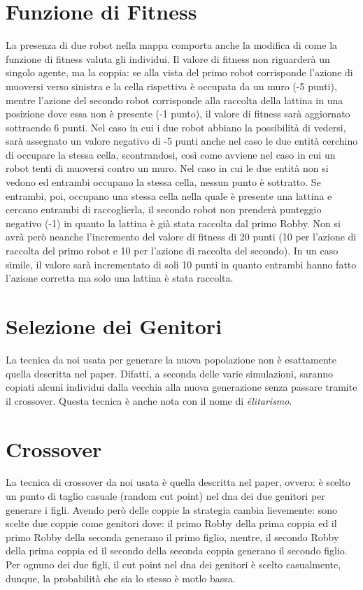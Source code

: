 \section{Funzione di Fitness}
La presenza di due robot nella mappa comporta anche la modifica di come la
funzione di fitness valuta gli individui. Il valore di fitness non riguarderà un
singolo agente, ma la coppia: se alla vista del primo robot corrisponde l'azione
di muoversi verso sinistra e la cella rispettiva è occupata da un muro (-5
punti), mentre l'azione del secondo robot corrisponde alla raccolta della
lattina in una posizione dove essa non è presente (-1 punto), il valore di
fitness sarà aggiornato sottraendo 6 punti.\newline
Nel caso in cui i due robot abbiano la possibilità di vedersi, sarà assegnato un
valore negativo di -5 punti anche nel caso le due entità cerchino di occupare la
stessa cella, scontrandosi, così come avviene nel caso in cui un robot tenti di
muoversi contro un muro.\newline
Nel caso in cui le due entità non si vedono ed entrambi occupano la stessa
cella, nessun punto è sottratto. Se entrambi, poi, occupano una stessa cella
nella quale è presente una lattina e cercano entrambi di raccoglierla, il
secondo robot non prenderà punteggio negativo (-1) in quanto la lattina è già
stata raccolta dal primo Robby. Non si avrà però neanche l'incremento del valore
di fitness di 20 punti (10 per l'azione di raccolta del primo robot e 10 per
l'azione di raccolta del secondo). In un caso simile, il valore sarà
incrementato di soli 10 punti in quanto entrambi hanno fatto l'azione corretta
ma solo una lattina è stata raccolta.

\section{Selezione dei Genitori}
La tecnica da noi usata per generare la nuova popolazione non è esattamente
quella descritta nel paper. Difatti, a seconda delle varie simulazioni, saranno
copiati alcuni individui dalla vecchia alla nuova generazione senza passare
tramite il crossover. Questa tecnica è anche nota con il nome di
\textit{élitarismo}.

\section{Crossover}
La tecnica di crossover da noi usata è quella descritta nel paper, ovvero: è
scelto un punto di taglio casuale (random cut point) nel dna dei due genitori
per generare i figli.\newline
Avendo però delle coppie la strategia cambia lievemente: sono scelte due coppie
come genitori dove: il primo Robby della prima coppia ed il primo Robby della
seconda generano il primo figlio, mentre, il secondo Robby della prima coppia ed
il secondo della seconda coppia generano il secondo figlio. Per ognuno dei due
figli, il cut point nel dna dei genitori è scelto casualmente, dunque, la
probabilità che sia lo stesso è motlo bassa.

